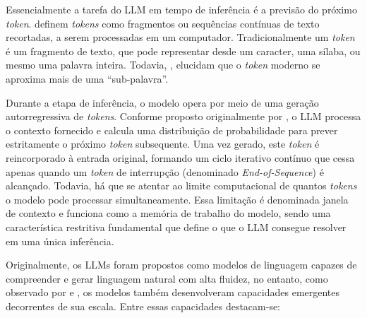 \documentclass[12pt,oneside,a4paper,brazil,sumario=tradicional]{abntex2}
\begin{document}
Essencialmente a tarefa do LLM em tempo de inferência é a previsão do próximo \textit{token}.  definem \textit{tokens} como fragmentos ou sequências contínuas de texto recortadas, a serem processadas em um computador. Tradicionalmente um \textit{token} é um fragmento de texto, que pode representar desde um caracter, uma sílaba, ou mesmo uma palavra inteira. Todavia, , elucidam que o \textit{token} moderno se aproxima mais de uma “sub-palavra”.

Durante a etapa de inferência, o modelo opera por meio de uma geração autorregressiva de \textit{tokens}. Conforme proposto originalmente por , o LLM processa o contexto fornecido e calcula uma distribuição de probabilidade para prever estritamente o próximo \textit{token} subsequente. Uma vez gerado, este \textit{token} é reincorporado à entrada original, formando um ciclo iterativo contínuo que cessa apenas quando um \textit{token} de interrupção (denominado \textit{End-of-Sequence}) é alcançado. Todavia, há que se atentar ao limite computacional de quantos \textit{tokens }o modelo pode processar simultaneamente. Essa limitação é denominada janela de contexto e funciona como a memória de trabalho do modelo, sendo uma característica restritiva fundamental que define o que o LLM consegue resolver em uma única inferência.

Originalmente, os LLMs foram propostos como modelos de linguagem capazes de compreender e gerar linguagem natural com alta fluidez, no entanto, como observado por  e , os modelos também desenvolveram capacidades emergentes decorrentes de sua escala. Entre essas capacidades destacam-se:
\end{document}
